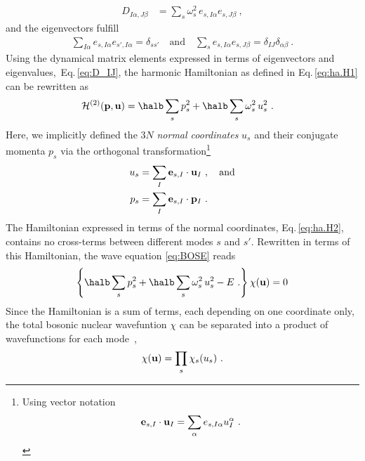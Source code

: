 \begin{align}
		D_{I \alpha, J \beta}
			&= \sum_s \omega^2_s \, e_{s, I \alpha} e_{s, J \beta}~,
			\label{eq:D_IJ}
\end{align}
and the eigenvectors fulfill
\begin{align}
	\sum_{I \alpha} e_{s, I \alpha} e_{s', I \alpha} = \delta_{s s'}
	\quad \text{and} \quad
	\sum_{s} e_{s, I \alpha} e_{s, J \beta} = \delta_{IJ} \delta_{\alpha \beta}~.
	\label{eq:completeness.e_s}
\end{align}
Using the dynamical matrix elements expressed in terms of eigenvectors and eigenvalues,~Eq.\,\eqref{eq:D_IJ}, the harmonic Hamiltonian as defined in Eq.\,\eqref{eq:ha.H1} can be rewritten as
\begin{align}
	\mathcal{H}^{(2)}({\bf p},  {\bf u})
		&= \halb \sum_s p_s^2 + 
		\halb \sum_{s} \omega_s^2	\, u_s^2~.
\label{eq:ha.H2}
\end{align}
Here, we implicitly defined the $3N$ \emph{normal coordinates} $u_s$ and their conjugate momenta $p_s$ via the orthogonal transformation\footnote{Using vector notation $${\bf e}_{s, I} \cdot {\bf u}_I = \sum_{\alpha} e_{s, I \alpha} u_I^\alpha~.$$}
\begin{align}
	u_s
		&= \sum_{I} {\bf e}_{s, I} \cdot {\bf u}_{I}~,\quad\text{and}
		\label{eq:u_s} \\
	p_s
	&=\sum_{I} {\bf e}_{s, I} \cdot {\bf p}_{I} ~.
		\label{eq:p_s}
\end{align}
The Hamiltonian expressed in terms of the normal coordinates, Eq.\,\eqref{eq:ha.H2}, contains no cross-terms between different modes $s$ and $s'$. Rewritten in terms of this Hamiltonian, the wave equation \eqref{eq:BOSE} reads
\begin{align}
	\left\{
		\halb \sum_s p_s^2 + \halb \sum_{s} \omega_s^2	\, u_s^2 - E~.
	\right\} \chi ({\bf u})
	= 0
	\label{eq:ha.SE.2}
\end{align}
Since the Hamiltonian is a sum of terms, each depending on one coordinate only, the total bosonic nuclear wavefuntion $\chi$ can be separated into a product of wavefunctions for each mode~\cite[p.\,175]{BornHuang},
\begin{align}
	\chi({\bf u}) = \prod_{s} \chi_s (u_s)~.
	\label{eq:ha.chi}
\end{align}

